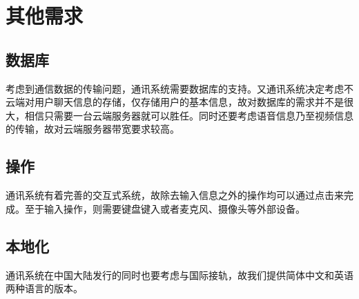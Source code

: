\chapter{其他需求}
\iffalse
<Any other requirement specified by the customer need to be listed below with appropriate section. This may include Database, Coding requirements, Error handling, Testing requirements etc., Few sample requirements are listed below. Please note, you may remove or add if something is not applicable. >

使用适当的章节，详细说明任何其他客户需求，包括数据库，编码需求，错误处理，测试需求等。下面仅列出了少量样例，你可以删除和增加项目。
\fi
\section{数据库}
考虑到通信数据的传输问题，通讯系统需要数据库的支持。又通讯系统决定考虑不云端对用户聊天信息的存储，仅存储用户的基本信息，故对数据库的需求并不是很大，相信只需要一台云端服务器就可以胜任。同时还要考虑语音信息乃至视频信息的传输，故对云端服务器带宽要求较高。
\section{操作}
通讯系统有着完善的交互式系统，故除去输入信息之外的操作均可以通过点击来完成。至于输入操作，则需要键盘键入或者麦克风、摄像头等外部设备。
\section{本地化}
通讯系统在中国大陆发行的同时也要考虑与国际接轨，故我们提供简体中文和英语两种语言的版本。
